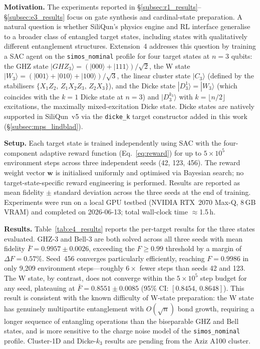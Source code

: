 \textbf{Motivation.}
The experiments reported in \S\ref{subsec:r1_results}--\S\ref{subsec:e3_results}
focus on gate synthesis and cardinal-state preparation.
A natural question is whether SiliQun's physics engine and RL interface
generalise to a broader class of entangled target states, including states
with qualitatively different entanglement structures.
Extension~4 addresses this question by training a SAC agent on the
\texttt{simos\_nominal} profile for four target states at $n = 3$ qubits:
the GHZ state $|GHZ_3\rangle = (|000\rangle + |111\rangle)/\sqrt{2}$,
the W state $|W_3\rangle = (|001\rangle + |010\rangle + |100\rangle)/\sqrt{3}$,
the linear cluster state $|C_3\rangle$ (defined by the stabilisers
$\{X_1 Z_2,\, Z_1 X_2 Z_3,\, Z_2 X_3\}$),
and the Dicke state $|D_3^1\rangle = |W_3\rangle$ (which coincides with
the $k=1$ Dicke state at $n=3$) and $|D_3^{k_3}\rangle$ with $k=\lfloor n/2 \rfloor$
excitations, the maximally mixed-excitation Dicke state.
Dicke states are natively supported in SiliQun~v5 via the
\texttt{dicke\_k} target constructor added in this work
(\S\ref{subsec:mps_lindblad}).

\textbf{Setup.}
Each target state is trained independently using SAC with the
four-component adaptive reward function (Eq.~\ref{eq:reward})
for up to $5 \times 10^5$ environment steps
across three independent seeds (42, 123, 456).
The reward weight vector $\mathbf{w}$ is initialised uniformly and optimised
via Bayesian search; no target-state-specific reward engineering is performed.
Results are reported as mean fidelity $\pm$ standard deviation across
the three seeds at the end of training.
Experiments were run on a local GPU testbed (NVIDIA RTX~2070 Max-Q, 8\,GB VRAM)
and completed on 2026-06-13; total wall-clock time $\approx$1.5\,h.

\textbf{Results.}
Table~\ref{tab:e4_results} reports the per-target results for the three
states evaluated.
GHZ-3 and Bell-3 are both solved across all three seeds with mean fidelity
$\bar{F} = 0.9957 \pm 0.0026$, exceeding the $F \geq 0.99$ threshold
by a margin of $\Delta F = 0.57\%$.
Seed~456 converges particularly efficiently, reaching $F = 0.9986$ in only
9{,}209 environment steps---roughly $6\times$ fewer steps than seeds 42 and 123.
The W state, by contrast, does not converge within the $5 \times 10^5$ step
budget for any seed, plateauing at $\bar{F} = 0.8551 \pm 0.0085$
(95\% CI: $[0.8454,\,0.8648]$).
This result is consistent with the known difficulty of W-state preparation:
the W state has genuinely multipartite entanglement with $O(\sqrt{n})$ bond
growth, requiring a longer sequence of entangling operations than the
biseparable GHZ and Bell states, and is more sensitive to the charge noise
model of the \texttt{simos\_nominal} profile.
Cluster-1D and Dicke-$k_3$ results are pending from the Aziz A100 cluster.

